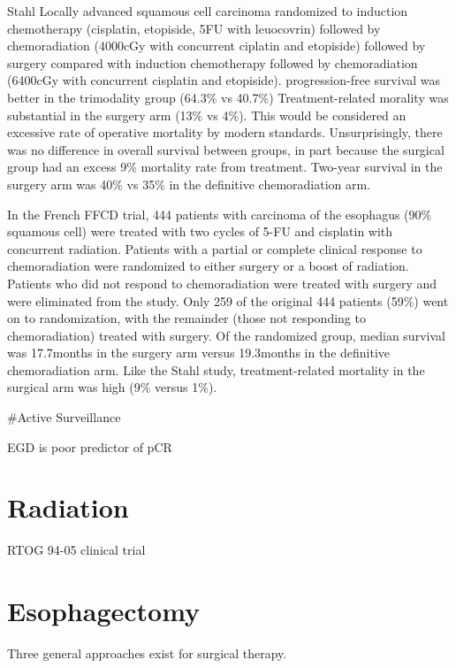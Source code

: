 \documentclass[
]{book}
\begin{document}
Stahl Locally advanced squamous cell carcinoma randomized to induction chemotherapy (cisplatin, etopiside, 5FU with leuocovrin) followed by chemoradiation (4000cGy with concurrent ciplatin and etopiside) followed by surgery compared with induction chemotherapy followed by chemoradiation (6400cGy with concurrent cisplatin and etopiside).\citep{stahl2310} progression-free survival was better in the trimodality group (64.3\% vs 40.7\%) Treatment-related morality was substantial in the surgery arm (13\% vs 4\%). This would be considered an excessive rate of operative mortality by modern standards. Unsurprisingly, there was no difference in overall survival between groups, in part because the surgical group had an excess 9\% mortality rate from treatment. Two-year survival in the surgery arm was 40\% vs 35\% in the definitive chemoradiation arm.

In the French FFCD trial, 444 patients with carcinoma of the esophagus (90\% squamous cell) were treated with two cycles of 5-FU and cisplatin with concurrent radiation.\citep{bedenne1160} Patients with a partial or complete clinical response to chemoradiation were randomized to either surgery or a boost of radiation. Patients who did not respond to chemoradiation were treated with surgery and were eliminated from the study. Only 259 of the original 444 patients (59\%) went on to randomization, with the remainder (those not responding to chemoradiation) treated with surgery. Of the randomized group, median survival was 17.7months in the surgery arm versus 19.3months in the definitive chemoradiation arm. Like the Stahl study, treatment-related mortality in the surgical arm was high (9\% versus 1\%).

\#Active Surveillance

EGD is poor predictor of pCR \citep{sarkaria764}

\hypertarget{radiation}{%
\chapter{Radiation}\label{radiation}}

RTOG 94-05 clinical trial \citep{minsky1167}

\hypertarget{esophagectomy-1}{%
\chapter{Esophagectomy}\label{esophagectomy-1}}

Three general approaches exist for surgical therapy.
\end{document}
